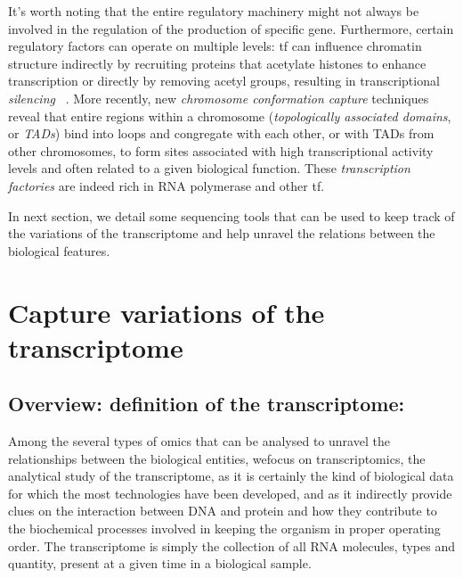 
It's worth noting that the entire regulatory machinery might not always be involved in the regulation of the production of specific gene. Furthermore, certain regulatory factors can operate on multiple levels: \acrfull{tf} can influence chromatin structure indirectly by recruiting proteins that acetylate histones to enhance transcription or directly by removing acetyl groups, resulting in transcriptional \emph{silencing} ~\autocite{walters_etal12}. More recently, new \emph{chromosome conformation capture} techniques reveal that entire regions within a chromosome (\emph{topologically associated domains}, or \emph{TADs}) bind into loops and congregate with each other, or with TADs from other chromosomes, to form sites associated with high transcriptional activity levels and often related to a given biological function. These \emph{transcription factories} are indeed rich in RNA polymerase and other \acrshort{tf}. 

In next section, we detail some sequencing tools that can be used to keep track of the variations of the transcriptome and help unravel the relations between the biological features. 

\section{Capture variations of the transcriptome}
\subsection{Overview: definition of the transcriptome:} 
\label{subsec:transcriptome-overview}
Among the several types of omics that can be analysed to unravel the relationships between the biological entities, wefocus on transcriptomics, the analytical study of the transcriptome, as it is certainly the kind of biological data for which the most technologies have been developed, and as it indirectly provide clues on the interaction between DNA and protein and how they contribute to the biochemical processes involved in keeping the organism in proper operating order. The transcriptome is simply the collection of all RNA molecules, types and quantity, present at a given time in a biological sample.  

